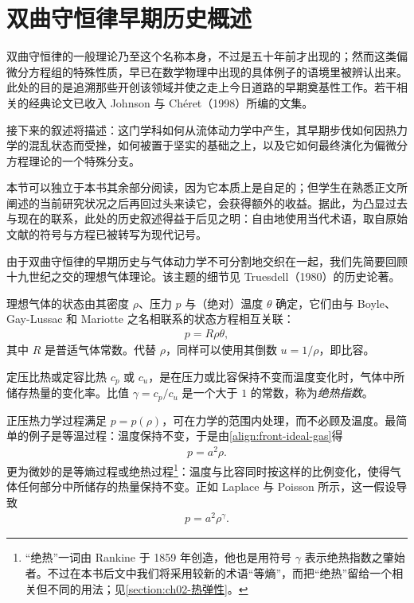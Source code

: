 \documentclass[../../main.tex]{subfiles}
\begin{document}

\chapter*{双曲守恒律早期历史概述}
\label{chapter:front-history}

双曲守恒律的一般理论乃至这个名称本身，不过是五十年前才出现的；然而这类偏微分方程组的特殊性质，早已在数学物理中出现的具体例子的语境里被辨认出来。此处的目的是追溯那些开创该领域并使之走上今日道路的早期奠基性工作。若干相关的经典论文已收入 Johnson 与 Chéret（1998）所编的文集。

接下来的叙述将描述：这门学科如何从流体动力学中产生，其早期步伐如何因热力学的混乱状态而受挫，如何被置于坚实的基础之上，以及它如何最终演化为偏微分方程理论的一个特殊分支。

本节可以独立于本书其余部分阅读，因为它本质上是自足的；但学生在熟悉正文所阐述的当前研究状况之后再回过头来读它，会获得额外的收益。据此，为凸显过去与现在的联系，此处的历史叙述得益于后见之明：自由地使用当代术语，取自原始文献的符号与方程已被转写为现代记号。

由于双曲守恒律的早期历史与气体动力学不可分割地交织在一起，我们先简要回顾十九世纪之交的理想气体理论。该主题的细节见 Truesdell（1980）的历史论著。

理想气体的状态由其密度 $\rho$、压力 $p$ 与（绝对）温度 $\theta$ 确定，它们由与 Boyle、Gay-Lussac 和 Mariotte 之名相联系的状态方程相互关联：
\begin{align}
p=R\rho\theta,\label{align:front-ideal-gas}
\end{align}
其中 $R$ 是普适气体常数。代替 $\rho$，同样可以使用其倒数 $u=1/\rho$，即比容。

定压比热或定容比热 $c_p$ 或 $c_u$，是在压力或比容保持不变而温度变化时，气体中所储存热量的变化率。比值 $\gamma=c_p/c_u$ 是一个大于 $1$ 的常数，称为\emph{绝热指数}。

正压热力学过程满足 $p=p(\rho)$，可在力学的范围内处理，而不必顾及温度。最简单的例子是等温过程：温度保持不变，于是由\eqref{align:front-ideal-gas}得
\begin{align}
p=a^{2}\rho.\label{align:front-isothermal}
\end{align}
更为微妙的是等熵过程或绝热过程\footnote{“绝热”一词由 Rankine 于 1859 年创造，他也是用符号 $\gamma$ 表示绝热指数之肇始者。不过在本书后文中我们将采用较新的术语“等熵”，而把“绝热”留给一个相关但不同的用法；见\cref{section:ch02-热弹性}。}：温度与比容同时按这样的比例变化，使得气体任何部分中所储存的热量保持不变。正如 Laplace 与 Poisson 所示，这一假设导致
\begin{align}
p=a^{2}\rho^{\gamma}.\label{align:front-isentropic}
\end{align}
\end{document}
